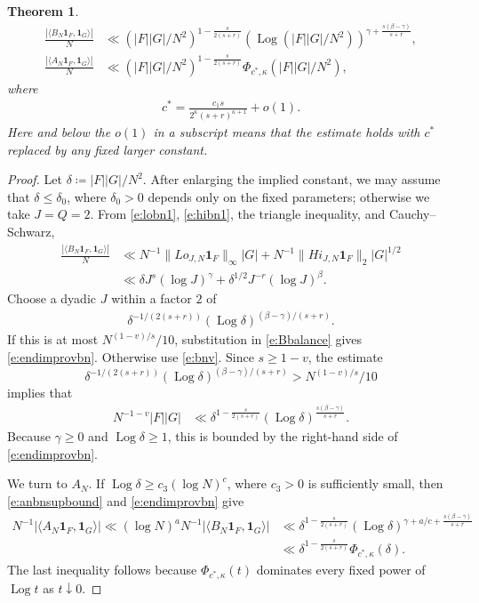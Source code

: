 \documentclass[12pt,reqno]{amsart}
\numberwithin{equation}{section}
\newtheorem{theorem}[equation]{Theorem}
\theoremstyle{definition}
\theoremstyle{remark}
\newcommand{\Log}{\operatorname{Log}}
\begin{document}
\begin{theorem}
\begin{align}
 \frac{|\langle B_N\mathbf1_F,\mathbf1_G\rangle|}{N}
 &\ll (|F||G|/N^2)^{1-\frac{s}{2(s+r)}}
 (\Log (|F||G|/N^2))^{\gamma+\frac{s(\beta-\gamma)}{s+r}},\label{e:endimprovbn}\\
 \frac{|\langle A_N\mathbf1_F,\mathbf1_G\rangle|}{N}
 &\ll (|F||G|/N^2)^{1-\frac{s}{2(s+r)}}\Phi_{c^*,\kappa}(|F||G|/N^2),
 \label{e:endimprovan}
\end{align}
where 
\begin{align}\label{e:cstar}
 c^*=\frac{c_1s}{2^\kappa(s+r)^{\kappa+1}}+o(1).
\end{align}
Here and below the $o(1)$ in a subscript means that the estimate holds
with $c^*$ replaced by any fixed larger constant.
\end{theorem}

\begin{proof}
Let $\delta \coloneqq |F||G|/N^2$. After enlarging the implied constant, we may assume that
$\delta\leq\delta_0$, where $\delta_0>0$ depends only on the fixed
parameters; otherwise we take $J=Q=2$.  From
\eqref{e:lobn1}, \eqref{e:hibn1}, the triangle inequality, and Cauchy--Schwarz,
\begin{align}\label{e:Bbalance}
 \frac{|\langle B_N\mathbf1_F,\mathbf1_G\rangle|}{N}
 &\ll N^{-1}\|Lo_{J,N}\mathbf{1}_F\|_\infty |G|+
 N^{-1}\|Hi_{J,N}\mathbf{1}_F\|_2 |G|^{1/2}\\
 &\ll\delta J^s(\log J)^\gamma
      +\delta^{1/2}J^{-r}(\log J)^\beta.
\end{align}
Choose a dyadic $J$ within a factor $2$ of
\begin{align}\label{e:Jchoice}
 \delta^{-1/(2(s+r))}(\Log\delta)^{(\beta-\gamma)/(s+r)}.
\end{align}
If this is at most $N^{(1-v)/s}/10$, substitution in
\eqref{e:Bbalance} gives \eqref{e:endimprovbn}.  Otherwise use
\eqref{e:bnv}.  Since $s\geq1-v$, the estimate 
$$\delta^{-1/(2(s+r))}(\Log\delta)^{(\beta-\gamma)/(s+r)} > N^{(1-v)/s}/10$$
implies that
\begin{align*}
 N^{-1-v}|F||G|
 &\ll \delta^{1-\frac{s}{2(s+r)}}
 (\Log\delta)^{\frac{s(\beta-\gamma)}{s+r}}.
\end{align*}
Because $\gamma\geq0$ and $\Log\delta\geq1$, this is bounded by the
right-hand side of \eqref{e:endimprovbn}.  

We turn to $A_N$.  If
$\Log\delta\geq c_3(\log N)^c$, where $c_3>0$ is sufficiently small, then
\eqref{e:anbnsupbound} and \eqref{e:endimprovbn} give
\begin{align*}
 N^{-1}|\langle A_N\mathbf1_F,\mathbf1_G\rangle|
 \ll (\log N)^a N^{-1}|\langle B_N\mathbf1_F,\mathbf1_G\rangle| &\ll \delta^{1-\frac{s}{2(s+r)}}(\Log\delta)^{\gamma+a/c+\frac{s(\beta-\gamma)}{s+r}}\\
 &\ll \delta^{1-\frac{s}{2(s+r)}}\Phi_{c^*,\kappa}(\delta).
\end{align*}
The last inequality follows because $\Phi_{c^*,\kappa}(t)$ dominates every
fixed power of $\Log t$ as $t\downarrow0$.


\end{proof}
\end{document}
